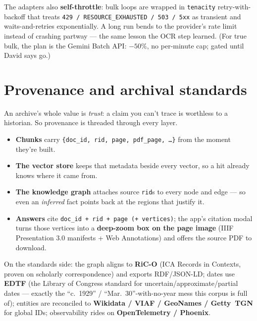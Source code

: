 \documentclass[11pt]{article}
\newcommand{\code}[1]{\texttt{#1}}
\begin{document}
The adapters also \textbf{self-throttle}: bulk loops are wrapped in \code{tenacity} retry-with-backoff
that treats \code{429 / RESOURCE\_EXHAUSTED / 503 / 5xx} as transient and waits-and-retries
exponentially. A long run bends to the provider's rate limit instead of crashing partway --- the same
lesson the OCR step learned. (For true bulk, the plan is the Gemini Batch API: $-50\%$, no per-minute
cap; gated until David says go.)

\FloatBarrier
\section{Provenance and archival standards}\label{sec:prov}

An archive's whole value is \emph{trust}: a claim you can't trace is worthless to a historian. So
provenance is threaded through every layer.

\begin{itemize}[leftmargin=1.4em, itemsep=2pt]
  \item \textbf{Chunks} carry \code{\{doc\_id, rid, page, pdf\_page, \dots\}} from the moment they're
        built.
  \item \textbf{The vector store} keeps that metadata beside every vector, so a hit already knows
        where it came from.
  \item \textbf{The knowledge graph} attaches source \code{rid}s to every node and edge --- so even an
        \emph{inferred} fact points back at the regions that justify it.
  \item \textbf{Answers} cite \code{doc\_id + rid + page (+ vertices)}; the app's citation modal turns
        those vertices into a \textbf{deep-zoom box on the page image} (IIIF Presentation 3.0
        manifests + Web Annotations) and offers the source PDF to download.
\end{itemize}

On the standards side: the graph aligns to \textbf{RiC-O} (ICA Records in Contexts, proven on
scholarly correspondence) and exports RDF/JSON-LD; dates use \textbf{EDTF} (the Library of Congress
standard for uncertain/approximate/partial dates --- exactly the ``c.\ 1929'' /
``Mar.\ 30''-with-no-year mess this corpus is full of); entities are reconciled to \textbf{Wikidata /
VIAF / GeoNames / Getty~TGN} for global IDs; observability rides on \textbf{OpenTelemetry / Phoenix}.
\end{document}

